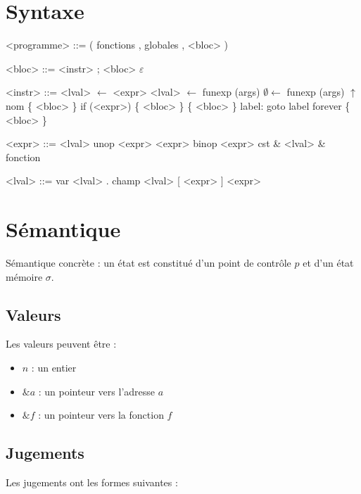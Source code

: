 \documentclass{article}
\begin{document}
\section{Syntaxe}

\begin{grammar}
<programme> ::= ( fonctions , globales , <bloc> )

     <bloc> ::= <instr> ; <bloc>
           \alt $ε$

    <instr> ::= <lval> $←$ <expr>
           \alt <lval> $←$ funexp (args)
           \alt  $∅ ←$ funexp (args)
           \alt $↑$ nom \{ <bloc> \}
           \alt if (<expr>) \{ <bloc> \}
           \alt \{ <bloc> \} label:
           \alt goto label
           \alt forever \{ <bloc> \}

    <expr> ::= <lval>
          \alt unop <expr>
          \alt <expr> binop <expr>
          \alt cst
          \alt \& <lval>
          \alt \& fonction

    <lval> ::= var
          \alt <lval> . champ
          \alt <lval> [ <expr> ]
          \alt * <expr>

\end{grammar}

\section{Sémantique}

Sémantique concrète : un état est constitué d'un point de contrôle $p$ et d'un
état mémoire $σ$.

\subsection{Valeurs}

Les valeurs peuvent être :

\begin{itemize}
\item $n$ : un entier
\item $\&a$ : un pointeur vers l'adresse $a$
\item $\&f$ : un pointeur vers la fonction $f$
\end{itemize}

\subsection{Jugements}

Les jugements ont les formes suivantes :
\end{document}
